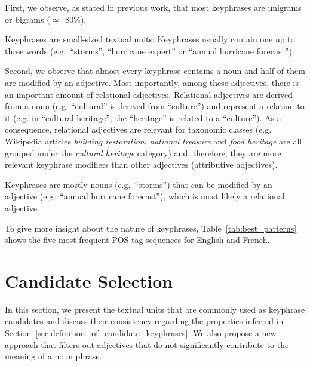     First, we observe, as stated in previous work, that most keyphrases are
    unigrams or bigrams ($\simeq$~80\%).
    
    \begin{property}\label{prop:informativity}
      Keyphrases are small-sized textual units; Keyphrases usually contain one
      up to three words (e.g.~``storms'', ``hurricane expert'' or ``annual
      hurricane forecast'').
    \end{property}

    Second, we observe that almost every keyphrase contains a noun and half of
    them are modified by an adjective. Most importantly, among these adjectives,
    there is an important amount of relational adjectives. Relational adjectives
    are derived from a noun (e.g. ``cultural'' is derived from ``culture'') and
    represent a relation to it (e.g. in ``cultural heritage'', the ``heritage''
    is related to a ``culture''). As a consequence, relational
    adjectives are relevant for taxonomic classes (e.g. Wikipedia articles
    \textit{building restoration}, \textit{national treasure} and \textit{food
    heritage} are all grouped under the \textit{cultural heritage} category)
    and, therefore, they are more relevant keyphrase modifiers than other
    adjectives (attributive adjectives).

    \begin{property}\label{prop:noun_phrases}
      Keyphrases are mostly nouns (e.g.~``storms'') that can be modified by an
      adjective (e.g.~``annual hurricane forecast''), which is most likely a
      relational adjective.
    \end{property}

    To give more insight about the nature of keyphrases,
    Table~\ref{tab:best_patterns} shows the five most frequent POS tag sequences
    for English and French.

\section{Candidate Selection}
\label{sec:candidate_extraction}
  In this section, we present the textual units that are commonly used as
  keyphrase candidates and discuss their consistency regarding the properties
  inferred in Section~\ref{sec:definition_of_candidate_keyphrases}. We also
  propose a new approach that filters out adjectives that do not significantly
  contribute to the meaning of a noun phrase.

